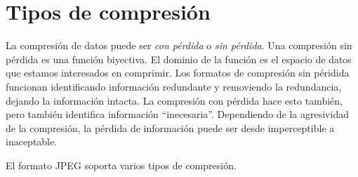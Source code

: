 \section{Tipos de compresión}

La compresión de datos puede ser \emph{con pérdida} o \emph{sin pérdida}. Una
compresión sin pérdida es una función biyectiva. El dominio de la función es el
espacio de datos que estamos interesados en comprimir. Los formatos de
compresión sin péridida funcionan identificando información redundante y
removiendo la redundancia, dejando la información intacta. La compresión con
pérdida hace esto también, pero también identifica información ``inecesaria''.
Dependiendo de la agresividad de la compresión, la pérdida de información puede
ser desde imperceptible a inaceptable.

El formato JPEG soporta varios tipos de compresión.

